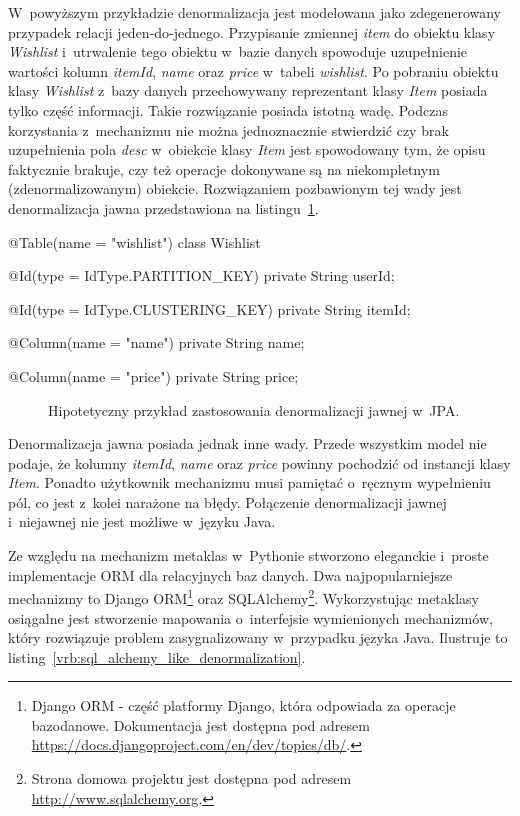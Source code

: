 W~powyższym przykładzie denormalizacja jest modelowana jako zdegenerowany przypadek relacji jeden-do-jednego. Przypisanie zmiennej \emph{item} do obiektu klasy \emph{Wishlist} i~utrwalenie tego obiektu w~bazie danych spowoduje uzupełnienie wartości kolumn \emph{itemId}, \emph{name} oraz \emph{price} w~tabeli \emph{wishlist}. Po pobraniu obiektu klasy \emph{Wishlist} z~bazy danych przechowywany reprezentant klasy \emph{Item} posiada tylko część informacji. Takie rozwiązanie posiada istotną wadę. Podczas korzystania z~mechanizmu nie można jednoznacznie stwierdzić czy brak uzupełnienia pola \emph{desc} w~obiekcie klasy \emph{Item} jest spowodowany tym, że opisu faktycznie brakuje, czy też operacje dokonywane są na niekompletnym (zdenormalizowanym) obiekcie. Rozwiązaniem pozbawionym tej wady jest denormalizacja jawna przedstawiona na listingu~\ref{vrb:jpa_explicit_denormalization_theory}.

\begin{verbbox}[\footnotesize]
	@Table(name = "wishlist")
	class Wishlist {
	    @Id(type = IdType.PARTITION_KEY) 
	    private String userId;

	    @Id(type = IdType.CLUSTERING_KEY)
	    private String itemId;

	    @Column(name = "name")
	    private String name;

	    @Column(name = "price")
	    private String price;
	}
\end{verbbox}

\begin{figure}[ht!]
	\centering
	\theverbbox
	\caption{Hipotetyczny przykład zastosowania denormalizacji jawnej w~JPA.}
	\label{vrb:jpa_explicit_denormalization_theory}
\end{figure}

Denormalizacja jawna posiada jednak inne wady. Przede wszystkim model nie podaje, że kolumny \emph{itemId}, \emph{name} oraz \emph{price} powinny pochodzić od instancji klasy \emph{Item}. Ponadto użytkownik mechanizmu musi pamiętać o~ręcznym wypełnieniu pól, co jest z~kolei narażone na błędy. Połączenie denormalizacji jawnej i~niejawnej nie jest możliwe w~języku Java. 

Ze względu na mechanizm metaklas w~Pythonie stworzono eleganckie i~proste implementacje ORM dla relacyjnych baz danych. Dwa najpopularniejsze mechanizmy to Django ORM\footnote{Django ORM - część platformy Django, która odpowiada za operacje bazodanowe. Dokumentacja jest dostępna pod adresem \url{https://docs.djangoproject.com/en/dev/topics/db/}.} oraz SQLAlchemy\footnote{Strona domowa projektu jest dostępna pod adresem \url{http://www.sqlalchemy.org}.}. Wykorzystując metaklasy osiągalne jest stworzenie mapowania o~interfejsie wymienionych mechanizmów, który rozwiązuje problem zasygnalizowany w~przypadku języka Java. Ilustruje to listing~\ref{vrb:sql_alchemy_like_denormalization}.

